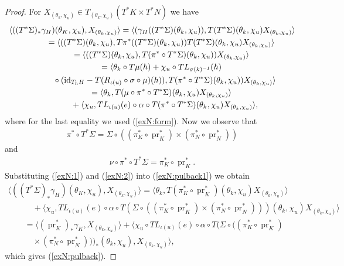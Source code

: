 \documentclass[10pt,a4paper]{amsart}
\newcommand{\id}{\text{\upshape id}}
\numberwithin{equation}{section}
\begin{document}
 \begin{proof}
 For $X_{(\theta_k,\chi_u)}\in T_{(\theta_k,\chi_u)}(T^*K\times T^*N)$ we have
\begin{gather}
 \langle((T^*\Sigma)_*\gamma_H)(\theta_K,\chi_u),X_{(\theta_k,\chi_u)}\rangle
 = \langle(\gamma_H((T^*\Sigma)(\theta_k,\chi_u)),T(T^*\Sigma)(\theta_k,\chi_u)X_{(\theta_k,\chi_u)}\rangle\nonumber\\
 \qquad{} =\langle((T^*\Sigma)(\theta_k,\chi_u),
 T\pi^*((T^*\Sigma)(\theta_k,\chi_u))T(T^*\Sigma)(\theta_k,\chi_u)X_{(\theta_k,\chi_u)}\rangle\nonumber\\
 \qquad{} =\langle((T^*\Sigma)(\theta_k,\chi_u),
 T(\pi^*\circ T^*\Sigma)(\theta_k,\chi_u))X_{(\theta_k,\chi_u)}\rangle\nonumber\\
\qquad{} =\langle\theta_k\circ T\mu(h)+\chi_u\circ TL_{\sigma(k)^{-1}}(h)\nonumber\\
 \qquad\quad{} \circ(\id_{T_hH}-T(R_{\iota(u)}\circ\sigma\circ\mu)(h)),
 T(\pi^*\circ T^*\Sigma)(\theta_k,\chi_u))X_{(\theta_k,\chi_u)}\rangle\nonumber\\
 \qquad{} =\langle\theta_k,T(\mu\circ \pi^*\circ T^*\Sigma)(\theta_k,\chi_u)X_{(\theta_k,\chi_u)}\rangle\nonumber\\
 \qquad\quad{} +
 \langle \chi_u, TL_{\iota(u)}(e)\circ \alpha\circ T(\pi^*\circ T^*\Sigma)(\theta_k,\chi_u)X_{(\theta_k,\chi_u)}\rangle,\label{exN:pulback1}
\end{gather}
where for the last equality we used (\ref{exN:form}). Now we observe that
\begin{gather}\label{exN:1}
\pi^*\circ T^*\Sigma=\Sigma\circ((\pi^*_K\circ \operatorname{pr}_K^*)\times (\pi_N^*\circ \operatorname{pr}_N^*))
\end{gather}
and
\begin{gather}\label{exN:2}
\nu\circ \pi^*\circ T^*\Sigma=\pi^*_K\circ \operatorname{pr}^*_K.
\end{gather}
Substituting (\ref{exN:1}) and (\ref{exN:2}) into (\ref{exN:pulback1}) we obtain
\begin{gather*}
\langle((T^*\Sigma)_*\gamma_H)(\theta_K,\chi_u),X_{(\theta_k,\chi_u)}\rangle
=\langle\theta_k,T(\pi^*_K\circ \operatorname{pr}^*_K)(\theta_k,\chi_u)X_{(\theta_k,\chi_u)}\rangle\nonumber\\
\qquad\quad{} +\langle \chi_u, TL_{\iota(u)}(e)\circ \alpha\circ T(\Sigma\circ((\pi^*_K\circ \operatorname{pr}_K^*)\times (\pi_N^*\circ \operatorname{pr}_N^*)))(\theta_k,\chi_u)X_{(\theta_k,\chi_u)}\rangle\nonumber\\
\qquad{} =\langle(\operatorname{pr}_K^*)_*\gamma_K,X_{(\theta_k,\chi_u)}\rangle+\langle \chi_u\circ TL_{\iota(u)}(e)\circ \alpha\circ T(\Sigma\circ((\pi^*_K\circ \operatorname{pr}_K^*)\\
\qquad\quad{} \times (\pi_N^*\circ \operatorname{pr}_N^*)))_*(\theta_k,\chi_u),X_{(\theta_k,\chi_u)}\rangle,
\end{gather*}
which gives (\ref{exN:pulback}).
\end{proof}
\end{document}
